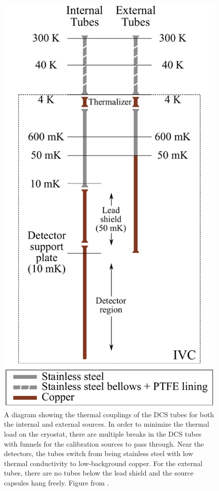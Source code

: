 \begin{figure}[htbp]
    \centering
    \includegraphics[height=0.4\paperheight]{Figures/thermal_coupling.pdf}
    \caption[A diagram showing the thermal couplings of the DCS tubes for both the internal and external sources]
    {A diagram showing the thermal couplings of the DCS tubes for both the internal and external sources.
    In order to minimize the thermal load on the cryostat, there are multiple breaks in the DCS tubes with funnels for the calibration sources to pass through.
    Near the detectors, the tubes switch from being stainless steel with low thermal conductivity to low-background copper.
    For the external tubes, there are no tubes below the lead shield and the source capsules hang freely.
    Figure from \cite{Cushman:2016cnv}.}
    \label{fig:dcs_thermal_coupling}
\end{figure}

